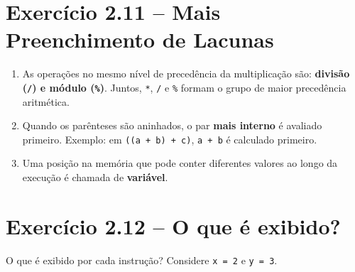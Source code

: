 \documentclass[12pt,a4paper]{article}
\begin{document}
\section{Exercício 2.11 -- Mais Preenchimento de Lacunas}

\begin{respostabox}[title={Exercício 2.11}]
\begin{enumerate}[label=\textbf{\alph*)}]
\item As operações no mesmo nível de precedência da multiplicação são: \textbf{divisão (\texttt{/}) e módulo (\texttt{\%})}.
Juntos, \texttt{*}, \texttt{/} e \texttt{\%} formam o grupo de maior precedência aritmética.

\item Quando os parênteses são aninhados, o par \textbf{mais interno} é avaliado primeiro.
Exemplo: em \texttt{((a + b) + c)}, \texttt{a + b} é calculado primeiro.

\item Uma posição na memória que pode conter diferentes valores ao longo da execução é chamada de \textbf{variável}.
\end{enumerate}
\end{respostabox}

\section{Exercício 2.12 -- O que é exibido?}

\begin{enunciadoBox}[Enunciado 2.12]
O que é exibido por cada instrução? Considere \texttt{x = 2} e \texttt{y = 3}.
\end{enunciadoBox}
\end{document}
